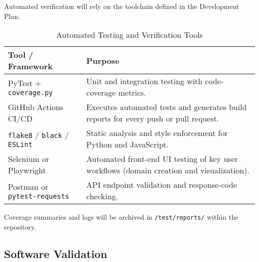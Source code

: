 \documentclass[12pt, titlepage]{article}
\begin{document}

Automated verification will rely on the toolchain defined in the Development
Plan.

\begin{table}[H]
\centering
\caption{Automated Testing and Verification Tools}
\setlength{\tabcolsep}{6pt}
\renewcommand{\arraystretch}{1.2}
\footnotesize

\begin{tabularx}{\textwidth}{l X}
\toprule
\textbf{Tool / Framework} & \textbf{Purpose} \\
\midrule
\arrayrulecolor[gray]{0.8}
PyTest + \texttt{coverage.py} &
Unit and integration testing with code-coverage metrics. \\
\hline
GitHub Actions CI/CD &
Executes automated tests and generates build reports for every push or pull
request. \\
\hline
\texttt{flake8} / \texttt{black} / \texttt{ESLint} &
Static analysis and style enforcement for Python and JavaScript. \\
\hline
Selenium or Playwright &
Automated front-end UI testing of key user workflows (domain creation and
visualization). \\
\hline
Postman or \texttt{pytest-requests} &
API endpoint validation and response-code checking. \\
\bottomrule
\end{tabularx}
\end{table}

Coverage summaries and logs will be archived in \texttt{/test/reports/} within
the repository.

\subsection{Software Validation}
\label{subsec:software-validation}



\end{document}
